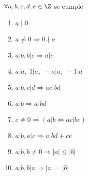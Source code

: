 \begin{proposition}
	\(\forall a,b,c,d,e \in \Z \) se cumple
	\begin{enumerate}
		\item \(a\mid 0 \)
		\item \(a \neq 0 \Rightarrow 0 \nmid a \)
		\item \(a|b, b | c \Rightarrow a|c \)
		\item \(a | a, \;1 | a,\; -a | a, \;-1 | a\)
		\item \(a | b, c| d \Rightarrow ac | bd \)
		\item \(a | b \Rightarrow a | bd \)
		\item \(c \neq 0 \Rightarrow (a|b \iff ac|bc )\)
		\item \(a|b, a|c \Rightarrow a|bd + ce\)
		\item \(a|b, b \neq 0 \Rightarrow |a| \leq |b| \)
		\item \(a|b,b|a \Rightarrow |a| = |b|\)
	\end{enumerate}
\end{proposition}
